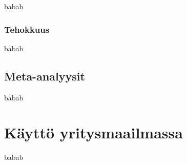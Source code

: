 \documentclass[finnish]{tktltiki2}
\theoremstyle{definition}
\theoremstyle{remark}
\begin{document}
babab

\subsubsection{Tehokkuus}

babab


\subsection{Meta-analyysit}


babab

\section{Käyttö yritysmaailmassa}


babab





%
%
% 
%









% 
\end{document}
